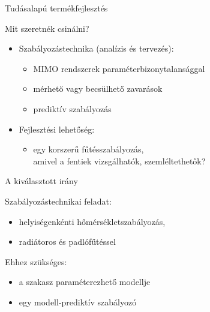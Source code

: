 \documentclass[14pt,handout]{beamer}
\begin{document}
\begin{frame}{Tudásalapú termékfejlesztés}

Mit szeretnék csinálni?
\pause
\vspace{6pt}

\begin{itemize}
	\setlength{\itemsep}{12pt}
	\item Szabályozástechnika (analízis és tervezés):
	\begin{itemize}
		\item MIMO rendszerek paraméterbizonytalansággal
		\item mérhető vagy becsülhető zavarások
		\item prediktív szabályozás
	\end{itemize}
	\pause

	\item Fejlesztési lehetőség:
	\begin{itemize}
		\item egy korszerű fűtésszabályozás, \\
		amivel a fentiek vizsgálhatók, szemléltethetők?
	\end{itemize}
\end{itemize}
\end{frame}

\begin{frame}{A kiválasztott irány}

Szabályozástechnikai feladat:

\begin{itemize}
	\item helyiségenkénti hőmérsékletszabályozás,
	\item radiátoros és padlófűtéssel
\end{itemize}
\vspace{6pt}

Ehhez szükséges:


\begin{itemize}
	\item a szakasz paraméterezhető modellje
	\item egy modell-prediktív szabályozó
\end{itemize}


\end{frame}
\end{document}
